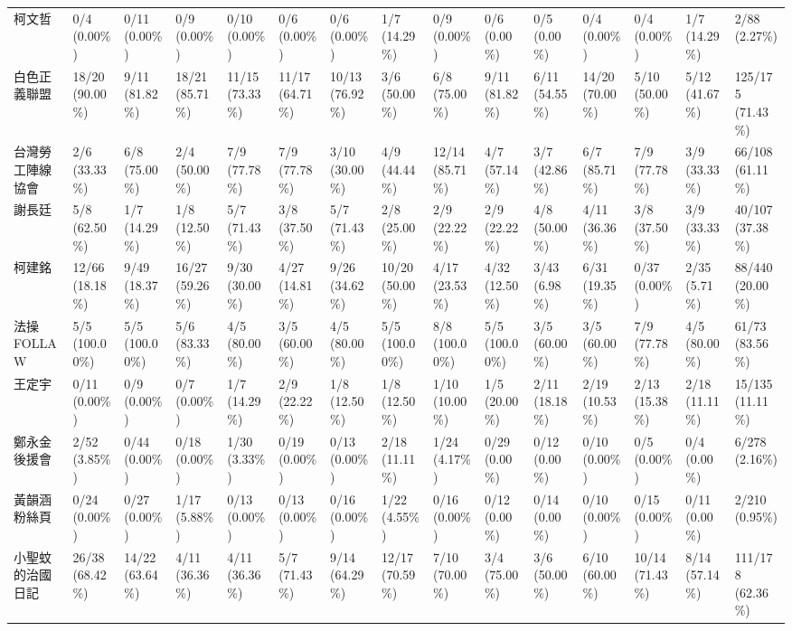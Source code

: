 \documentclass[a4paper, 10pt, conference]{ieeeconf}       %
\begin{document}
\begin{CJK}{UTF8}{bsmi}
\begin{landscape}
\begin{longtable}[c]{@{}L{2.45cm}L{1.1cm}L{1.1cm}L{1.1cm}L{1.1cm}L{1.1cm}L{1.1cm}L{1.1cm}L{1.1cm}L{1.1cm}L{1.1cm}L{1.1cm}L{1.1cm}L{1.1cm}L{1.1cm}@{}}
柯文哲 & 0/4 (0.00\%) & 0/11 (0.00\%) & 0/9 (0.00\%) & 0/10 (0.00\%) & 0/6 (0.00\%) & 0/6 (0.00\%) & 1/7 (14.29\%) & 0/9 (0.00\%) & 0/6 (0.00\%) & 0/5 (0.00\%) & 0/4 (0.00\%) & 0/4 (0.00\%) & 1/7 (14.29\%) & 2/88 (2.27\%) \\
白色正義聯盟 & 18/20 (90.00\%) & 9/11 (81.82\%) & 18/21 (85.71\%) & 11/15 (73.33\%) & 11/17 (64.71\%) & 10/13 (76.92\%) & 3/6 (50.00\%) & 6/8 (75.00\%) & 9/11 (81.82\%) & 6/11 (54.55\%) & 14/20 (70.00\%) & 5/10 (50.00\%) & 5/12 (41.67\%) & 125/175 (71.43\%) \\
台灣勞工陣線協會 & 2/6 (33.33\%) & 6/8 (75.00\%) & 2/4 (50.00\%) & 7/9 (77.78\%) & 7/9 (77.78\%) & 3/10 (30.00\%) & 4/9 (44.44\%) & 12/14 (85.71\%) & 4/7 (57.14\%) & 3/7 (42.86\%) & 6/7 (85.71\%) & 7/9 (77.78\%) & 3/9 (33.33\%) & 66/108 (61.11\%) \\
謝長廷 & 5/8 (62.50\%) & 1/7 (14.29\%) & 1/8 (12.50\%) & 5/7 (71.43\%) & 3/8 (37.50\%) & 5/7 (71.43\%) & 2/8 (25.00\%) & 2/9 (22.22\%) & 2/9 (22.22\%) & 4/8 (50.00\%) & 4/11 (36.36\%) & 3/8 (37.50\%) & 3/9 (33.33\%) & 40/107 (37.38\%) \\
柯建銘 & 12/66 (18.18\%) & 9/49 (18.37\%) & 16/27 (59.26\%) & 9/30 (30.00\%) & 4/27 (14.81\%) & 9/26 (34.62\%) & 10/20 (50.00\%) & 4/17 (23.53\%) & 4/32 (12.50\%) & 3/43 (6.98\%) & 6/31 (19.35\%) & 0/37 (0.00\%) & 2/35 (5.71\%) & 88/440 (20.00\%) \\
法操FOLLAW & 5/5 (100.00\%) & 5/5 (100.00\%) & 5/6 (83.33\%) & 4/5 (80.00\%) & 3/5 (60.00\%) & 4/5 (80.00\%) & 5/5 (100.00\%) & 8/8 (100.00\%) & 5/5 (100.00\%) & 3/5 (60.00\%) & 3/5 (60.00\%) & 7/9 (77.78\%) & 4/5 (80.00\%) & 61/73 (83.56\%) \\
王定宇 & 0/11 (0.00\%) & 0/9 (0.00\%) & 0/7 (0.00\%) & 1/7 (14.29\%) & 2/9 (22.22\%) & 1/8 (12.50\%) & 1/8 (12.50\%) & 1/10 (10.00\%) & 1/5 (20.00\%) & 2/11 (18.18\%) & 2/19 (10.53\%) & 2/13 (15.38\%) & 2/18 (11.11\%) & 15/135 (11.11\%) \\
鄭永金後援會 & 2/52 (3.85\%) & 0/44 (0.00\%) & 0/18 (0.00\%) & 1/30 (3.33\%) & 0/19 (0.00\%) & 0/13 (0.00\%) & 2/18 (11.11\%) & 1/24 (4.17\%) & 0/29 (0.00\%) & 0/12 (0.00\%) & 0/10 (0.00\%) & 0/5 (0.00\%) & 0/4 (0.00\%) & 6/278 (2.16\%) \\
黃韻涵粉絲頁 & 0/24 (0.00\%) & 0/27 (0.00\%) & 1/17 (5.88\%) & 0/13 (0.00\%) & 0/13 (0.00\%) & 0/16 (0.00\%) & 1/22 (4.55\%) & 0/16 (0.00\%) & 0/12 (0.00\%) & 0/14 (0.00\%) & 0/10 (0.00\%) & 0/15 (0.00\%) & 0/11 (0.00\%) & 2/210 (0.95\%) \\
小聖蚊的治國日記 & 26/38 (68.42\%) & 14/22 (63.64\%) & 4/11 (36.36\%) & 4/11 (36.36\%) & 5/7 (71.43\%) & 9/14 (64.29\%) & 12/17 (70.59\%) & 7/10 (70.00\%) & 3/4 (75.00\%) & 3/6 (50.00\%) & 6/10 (60.00\%) & 10/14 (71.43\%) & 8/14 (57.14\%) & 111/178 (62.36\%) \\

\end{longtable}
\end{landscape}
\end{CJK}
\end{document}
